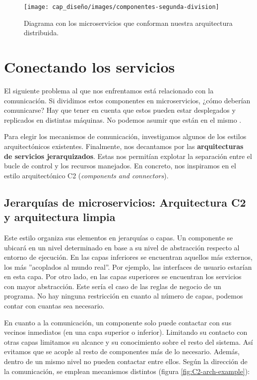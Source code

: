 \begin{figure}[htb]
  \centering
  \texttt{[image: cap\_diseño/images/componentes-segunda-division]}
  \caption{Diagrama con los microservicios que conforman nuestra arquitectura distribuida.}
  \label{fig:mape-k-microservices}
\end{figure}

\section{Conectando los servicios}

El siguiente problema al que nos enfrentamos está relacionado con la comunicación. Si dividimos estos componentes en microservicios, ¿cómo deberían comunicarse? Hay que tener en cuenta que estos pueden estar desplegados y replicados en distintas máquinas. No podemos asumir que están en el mismo .

Para elegir los mecanismos de comunicación, investigamos algunos de los estilos arquitectónicos existentes. Finalmente, nos decantamos por las \textbf{arquitecturas de servicios jerarquizados}. Estas nos permitían explotar la separación entre el bucle de control y los recursos manejados. En concreto, nos inspiramos en el estilo arquitectónico C2 (\emph {components and connectors})\cite{taylorComponentMessagebasedArchitectural1996a, UCISoftwareArchitecture}.

\subsection{Jerarquías de microservicios: Arquitectura C2 y arquitectura limpia}

Este estilo organiza sus elementos en jerarquías o capas. Un componente se ubicará en un nivel determinado en base a su nivel de abstracción respecto al entorno de ejecución. En las capas inferiores se encuentran aquellos más externos, los más ''acoplados al mundo real''. Por ejemplo, las interfaces de usuario estarían en esta capa. Por otro lado, en las capas superiores se encuentran los servicios con mayor abstracción. Este sería el caso de las reglas de negocio de un programa. No hay ninguna restricción en cuanto al número de capas, podemos contar con cuantas sea necesario.

En cuanto a la comunicación, un componente solo puede contactar con sus vecinos inmediatos (en una capa superior o inferior). Limitando su contacto con otras capas limitamos su alcance y su conocimiento sobre el resto del sistema. Así evitamos que se acople al resto de componentes más de lo necesario. Además, dentro de un mismo nivel no pueden contactar entre ellos. Según la dirección de la comunicación, se emplean mecanismos distintos (figura \ref{fig:C2-arch-example}):

